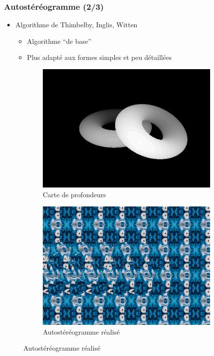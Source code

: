 \documentclass{beamer}
\begin{document}
\begin{frame}
\frametitle{Autostéréogramme (2/3)}
\begin{itemize}[label=$\bullet$]
\item Algorithme de Thimbelby, Inglis, Witten \cite{stereogram}
	\begin{itemize}[label=$\circ$]
	\item Algorithme ``de base''
	\item Plus adapté aux formes simples et peu détaillées
	\end{itemize}
\end{itemize}
\begin{figure}
\centering
\caption{Résultat obtenu avec l'algorithme de Thimbelby, Inglis, Witten}

\begin{subfigure}{.4\textwidth}
  \centering
  \includegraphics[width=1\linewidth]{donutdepth.png}
  \caption{Carte de profondeurs}
\end{subfigure}
\begin{subfigure}{.4\textwidth}
  \centering
  \includegraphics[width=1\linewidth]{donut1.png}
  \caption{Autostéréogramme réalisé}
\end{subfigure}
\end{figure}


\end{frame}
\end{document}
